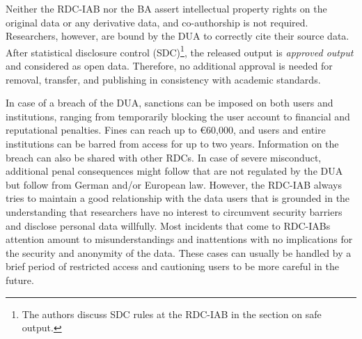 Neither the RDC-IAB nor the BA assert intellectual property rights on the original data or any derivative data, and co-authorship is not required. Researchers, however, are bound by the DUA to correctly cite their source data. After statistical disclosure control (SDC)\footnote{The authors discuss SDC rules at the RDC-IAB in the section on safe output.}, the released output is \emph{approved output} and considered as open data. Therefore, no additional approval is needed for removal, transfer, and publishing in consistency with academic standards.

In case of a breach of the DUA, sanctions can be imposed on both users and institutions, ranging from temporarily blocking the user account to financial and reputational penalties. Fines can reach up to €60,000, and users and entire institutions can be barred from access for up to two years. Information on the breach can also be shared with other RDCs. In case of severe misconduct, additional penal consequences might follow that are not regulated by the DUA but follow from German and/or European law. However, the RDC-IAB always tries to maintain a good relationship with the data users that is grounded in the understanding that researchers have no interest to circumvent security barriers and disclose personal data willfully. Most incidents that come to RDC-IABs attention amount to misunderstandings and inattentions with no implications for the security and anonymity of the data. These cases can usually be handled by a brief period of restricted access and cautioning users to be more careful in the future.

